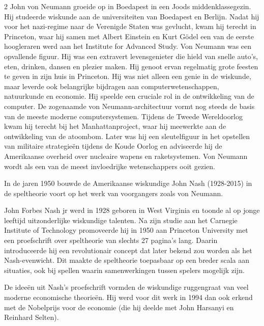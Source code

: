 \begin{multicols}{2}
John von Neumann groeide op in Boedapest in een Joods middenklassegezin. Hij studeerde wiskunde aan de universiteiten van Boedapest en Berlijn. Nadat hij voor het nazi-regime naar de Verenigde Staten was gevlucht, kwam hij terecht in Princeton, waar hij samen met Albert Einstein en Kurt Gödel een van de eerste hoogleraren werd aan het Institute for Advanced Study. Von Neumann was een opvallende figuur. Hij was een extravert levensgenieter die hield van snelle auto's, eten, drinken, dansen en plezier maken. Hij genoot ervan regelmatig grote feesten te geven in zijn huis in Princeton. Hij was niet alleen een genie in de wiskunde, maar leverde ook belangrijke bijdragen aan computerwetenschappen, natuurkunde en economie. Hij speelde een cruciale rol in de ontwikkeling van de computer. De zogenaamde von Neumann-architectuur vormt nog steeds de basis van de meeste moderne computersystemen. Tijdens de Tweede Wereldoorlog kwam hij terecht bij het Manhattanproject, waar hij meewerkte aan de ontwikkeling van de atoombom. Later was hij een sleutelfiguur in het opstellen van militaire strategieën tijdens de Koude Oorlog en adviseerde hij de Amerikaanse overheid over nucleaire wapens en raketsystemen. Von Neumann wordt als een van de meest invloedrijke wetenschappers ooit gezien.

In de jaren 1950 bouwde de Amerikaanse wiskundige John Nash (1928-2015) in de speltheorie voort op het werk van voorgangers zoals von Neumann.

John Forbes Nash jr werd in 1928 geboren in West Virginia en toonde al op jonge leeftijd uitzonderlijke wiskundige talenten. Na zijn studie aan het Carnegie Institute of Technology promoveerde hij in 1950 aan Princeton University met een proefschrift over speltheorie van slechts 27 pagina’s lang. Daarin introduceerde hij een 
revolutionair concept dat later bekend zou worden als het Nash-evenwicht. Dit maakte de speltheorie toepasbaar op een breder scala aan situaties, ook bij spellen waarin samenwerkingen tussen spelers mogelijk zijn.


De ideeën uit Nash's proefschrift vormden de wiskundige ruggengraat van veel moderne economische theorieën. Hij werd voor dit werk in 1994 dan ook erkend met de Nobelprijs voor de economie (die hij deelde met John Harsanyi en Reinhard Selten).


\end{multicols}
